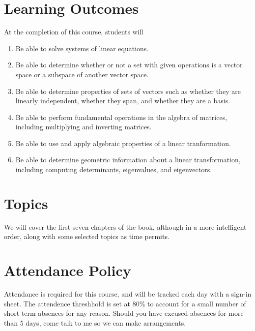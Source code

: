 \documentclass[letterpaper]{article}
\begin{document}
\section*{\fontsize{12}{15}\selectfont Learning Outcomes}
At the completion of this course, students will 
\begin{enumerate}[1)]
\item Be able to solve systems of linear equations.
\item Be able to determine whether or not a set with given operations is a vector space or a subspace of another vector space.
\item Be able to determine properties of sets of vectors such as whether they are linearly independent, whether they span, and whether they are a basis.
\item Be able to perform fundamental operations in the algebra of matrices, including multiplying and inverting matrices.
\item Be able to use and apply algebraic properties of a linear tranformation.
\item Be able to determine geometric information about a linear transformation, including computing determinants, eigenvalues, and eigenvectors.
\end{enumerate}

\section*{\fontsize{12}{15}\selectfont Topics}
We will cover the first seven chapters of the book, although in a more intelligent order, along with some selected topics as time permits.


\section*{\fontsize{12}{15}\selectfont Attendance Policy}
Attendance is required for this course, and will be tracked each day with a sign-in sheet.  The attendence threshhold is set at 80\% to account for a small number of short term absences for any reason.  Should you have excused absences for more than 5 days, come talk to me so we can make arrangements.
\end{document}
